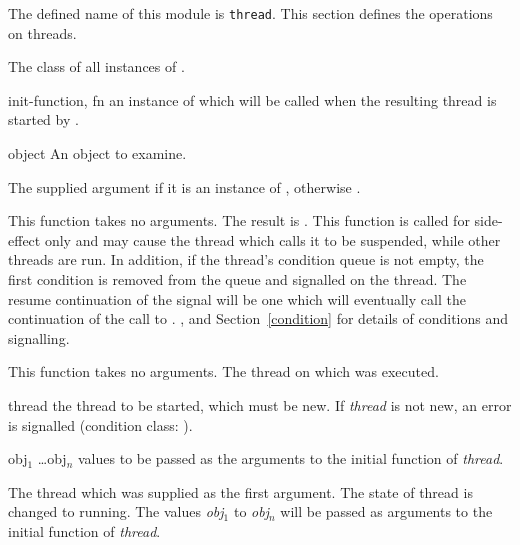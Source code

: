 \begin{optDefinition}
The defined name of this module is {\tt thread}.
This section defines the operations on threads.

%
The class of all instances of .
%
\begin{initoptions}
    \item[init-function, fn] an instance of  which will be
    called when the resulting thread is started by .
\end{initoptions}

%
\begin{arguments}
    \item[object] An object to examine.
\end{arguments}
%
\result%
The supplied argument if it is an instance of , otherwise
\nil.

%
This function takes no arguments.
%
\result%
The result is \nil.
%
\remarks%
This function is called for side-effect only and may cause the thread which
calls it to be suspended, while other threads are run.  In addition, if the
thread's condition queue is not empty, the first condition is removed from the
queue and signalled on the thread.  The resume continuation of the signal will
be one which will eventually call the continuation of the call to
.
%
\seealso%
,  and Section~\ref{condition} for
details of conditions and signalling.

%
This function takes no arguments.
%
\result%
The thread on which  was executed.

\begin{arguments}
    \item[thread] the thread to be started, which must be new.  If {\em thread}
    is not new, an error is signalled (condition class:
    ).

    \item[obj$_1$ \ldots obj$_n$] values to be passed as the arguments to the
    initial function of {\em thread}.
\end{arguments}
%
\result%
The thread which was supplied as the first argument.
%
\remarks%
The state of thread is changed to running.  The values {\em obj$_1$} to {\em
    obj$_n$} will be passed as arguments to the initial function of {\em
    thread}.


\end{optDefinition}
